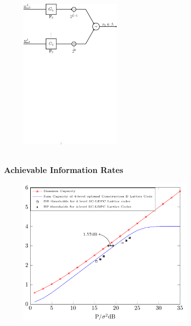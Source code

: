 \documentclass[10pt]{beamer}
\begin{document}
\begin{frame}
\begin{columns}
\begin{column}{0.47\textwidth}
            \begin{figure}
                \includegraphics[width=2in]{lattice_Constr_D1_user2.pdf}
            \end{figure}
        \end{column}
\end{columns}
\end{frame}


\begin{frame}\frametitle{Achievable Information Rates}
    \begin{figure}
        \begin{center}
            \includegraphics[width=3.5in]{ShapingLoss_Final_CTW.pdf}
        \end{center}
    \end{figure}
\end{frame}
\end{document}
